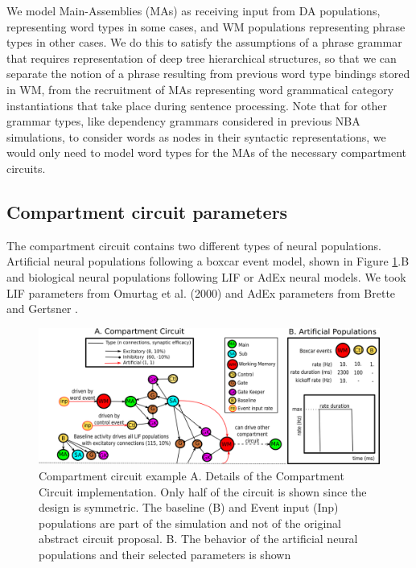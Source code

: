 \documentclass[10pt]{article}
\begin{document}
We model Main-Assemblies (MAs)  as receiving input from DA populations, representing word types in some cases, and WM populations representing phrase types in other cases.
We do this to satisfy the assumptions of a phrase grammar that requires representation of deep tree hierarchical structures, so that we can separate the notion of a phrase resulting from previous word type bindings stored in WM, from the recruitment of MAs representing word grammatical category instantiations that take place during sentence processing.
Note that for other grammar types, like dependency grammars considered in previous NBA simulations\cite{velde2015ambiguity}, to consider words as nodes in their syntactic representations, we would only need to model word types for the MAs of the necessary compartment circuits.


\subsection{Compartment circuit parameters}\label{compartment-circuit-parameters}

The compartment circuit contains two different types of neural populations.
Artificial neural populations following a boxcar event model, shown in Figure \ref{circuit_spec}.B and biological neural populations following LIF or AdEx neural models.
We took LIF parameters from Omurtag et al. (2000) \cite{omurtag2000simulation} and AdEx parameters
from Brette and Gertsner \cite{Brette_2005}.

\begin{figure}[h!]
  \begin{center}
    \includegraphics[width=1.00\columnwidth]{figures/circuit_specs3/circuit_specs3}
    \caption{{Compartment circuit example {\label{circuit_spec}} A.
Details
        of the Compartment Circuit implementation.
Only half of the
        circuit is shown since the design is symmetric.
The baseline
        (B) and Event input (Inp) populations are part of the
        simulation and not of the original abstract circuit proposal.
        B.
The behavior of the artificial neural populations and their
        selected parameters is shown%
      }}
  \end{center}
\end{figure}
\end{document}
